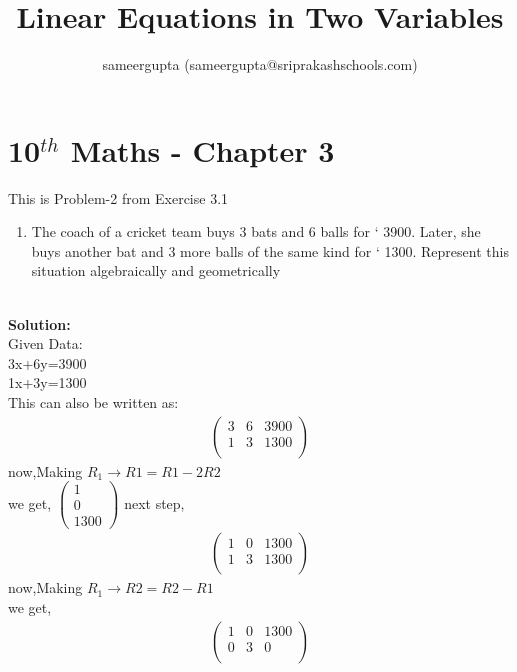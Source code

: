 \documentclass[12pt]{article}
\title{Linear Equations in Two Variables}
\author{sameergupta (sameergupta@sriprakashschools.com)}
\newcommand{\myvec}[1]{\ensuremath{\begin{pmatrix}#1\end{pmatrix}}}
\newcommand{\solution}{\noindent \textbf{Solution: }}
\begin{document}
\maketitle
\section*{10$^{th}$ Maths - Chapter 3}
This is Problem-2 from Exercise 3.1
\begin{enumerate}
\item The coach of a cricket team buys 3 bats and 6 balls for ` 3900. Later, she buys another bat and 3 more balls of the same kind for ` 1300. Represent this situation algebraically and geometrically\\\\
\end{enumerate}
\solution \\
Given Data:\\
            3x+6y=3900\\
            1x+3y=1300\\

This can also be written as:
\begin{align}
\myvec{3&6&3900\\1&3&1300\\}
\end{align}
now,Making $R_1 \xrightarrow\ R1= R1-2R2$\\ 
we get,
\myvec{1\\0\\1300}
next step,
\begin{align}
\myvec{1&0&1300\\1&3&1300\\}
\end{align}
now,Making $R_1 \xrightarrow\ R2= R2-R1$\\
we get,
\begin{align}
\myvec{1&0&1300\\0&3&0\\}
\end{align}
\end{document}
